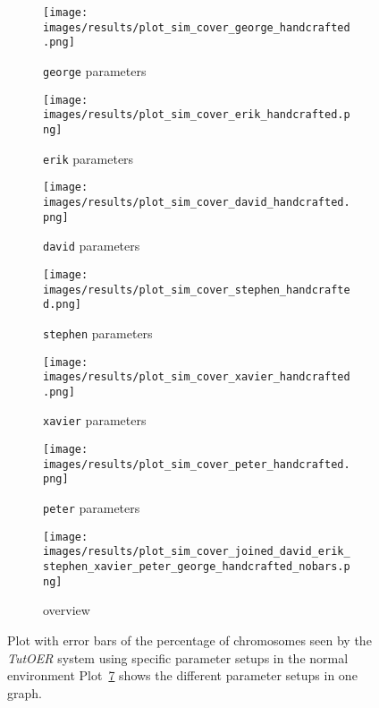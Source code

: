 
\begin{figure}[ht]
	\begin{subfigure}{0.48\linewidth}
	\texttt{[image: images/results/plot\_sim\_cover\_george\_handcrafted.png]}
	\caption{\texttt{george} parameters}
	\label{fig:cover_handcrafted_george}
	\end{subfigure}
	\hfill
	\begin{subfigure}{0.48\linewidth}
	\texttt{[image: images/results/plot\_sim\_cover\_erik\_handcrafted.png]}
	\caption{\texttt{erik} parameters}
	\label{fig:cover_handcrafted_erik}
	\end{subfigure}
	\begin{subfigure}{0.48\linewidth}
	\texttt{[image: images/results/plot\_sim\_cover\_david\_handcrafted.png]}
	\caption{\texttt{david} parameters}
	\label{fig:cover_handcrafted_david}
	\end{subfigure}
	\hfill
	\begin{subfigure}{0.48\linewidth}
	\texttt{[image: images/results/plot\_sim\_cover\_stephen\_handcrafted.png]}
	\caption{\texttt{stephen} parameters}
	\label{fig:cover_handcrafted_stephen}
	\end{subfigure}
	\begin{subfigure}{0.48\linewidth}
	\texttt{[image: images/results/plot\_sim\_cover\_xavier\_handcrafted.png]}
	\caption{\texttt{xavier} parameters}
	\label{fig:cover_handcrafted_xavier}
	\end{subfigure}
	\hfill
	\begin{subfigure}{0.48\linewidth}
	\texttt{[image: images/results/plot\_sim\_cover\_peter\_handcrafted.png]}
	\caption{\texttt{peter} parameters}
	\label{fig:cover_handcrafted_peter}
	\end{subfigure}
	\begin{subfigure}{\linewidth}
	\texttt{[image: images/results/plot\_sim\_cover\_joined\_david\_erik\_stephen\_xavier\_peter\_george\_handcrafted\_nobars.png]}
	\caption{overview}
	\label{fig:cover_handcrafted_overview_group1}
	\end{subfigure}
	\caption{Plot with error bars of the percentage of chromosomes seen by the \emph{TutOER}
	system using specific parameter setups in the normal environment
	Plot~\ref{fig:cover_handcrafted_overview_group1} shows the
	different parameter setups in one graph.}
	\label{fig:cover_handcrafted_container_group1}
\end{figure}


